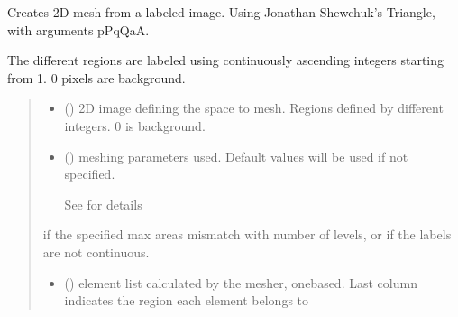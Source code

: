 \documentclass[letterpaper,10pt,english]{sphinxmanual}
\begin{document}
\begin{fulllineitems}
\label{\detokenize{_autosummary/nirfasterff.meshing.meshutils.img2mesh:nirfasterff.meshing.meshutils.img2mesh}}
\pysigstartsignatures
\pysiglinewithargsret
{}
{\sphinxparamcomma {}}
{}
\pysigstopsignatures
\sphinxAtStartPar
Creates 2D mesh from a labeled image. Using Jonathan Shewchuk’s Triangle, with arguments \sphinxhyphen{}pPqQaA.

\sphinxAtStartPar
The different regions are labeled using continuously ascending integers starting from 1. 0 pixels are background.
\begin{quote}\begin{description}
\begin{itemize}
\item {} 
\sphinxAtStartPar
{} () \textendash{} 2D image defining the space to mesh. Regions defined by different integers. 0 is background.

\item {} 
\sphinxAtStartPar
{} ({\hyperref[\detokenize{_autosummary/nirfasterff.utils.MeshingParams:nirfasterff.utils.MeshingParams}]{}}\sphinxstyleliteralemphasis{\sphinxupquote{, }}) \textendash{} 
\sphinxAtStartPar
meshing parameters used. Default values will be used if not specified.

\sphinxAtStartPar
See {\hyperref[\detokenize{_autosummary/nirfasterff.utils.MeshingParams2D:nirfasterff.utils.MeshingParams2D}]{}} for details


\end{itemize}

\sphinxAtStartPar
{} \textendash{} if the specified max areas mismatch with number of levels, or if the labels are not continuous.

\sphinxAtStartPar
\begin{itemize}
\item {} 
\sphinxAtStartPar
{} () \textendash{} element list calculated by the mesher, one\sphinxhyphen{}based. Last column indicates the region each element belongs to


\end{itemize}
\end{description}
\end{quote}
\end{fulllineitems}
\end{document}
